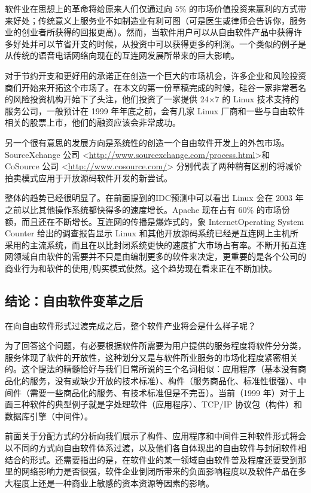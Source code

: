 软件业在思想上的革命将给原来人们仅通过向 5\% 的市场价值投资来赢利的方式带来好处；传统意义上服务业不如制造业有利可图（可是医生或律师会告诉你，服务业的创业者所获得的回报更高）。然而，当软件用户可以从自由软件产品中获得许多好处并可以节省开支的时候，从投资中可以获得更多的利润。一个类似的例子是从传统的语音电话网络向现在的互连网发展所带来的巨大影响。


对于节约开支和更好用的承诺正在创造一个巨大的市场机会，许多企业和风险投资商们开始来开拓这个市场了。在本文的第一份草稿完成的时候，硅谷一家非常著名的风险投资机构开始下了头注，他们投资了一家提供 24$\times$7 的 Linux 技术支持的服务公司，一般预计在 1999 年年底之前，会有几家 Linux 厂商和一些与自由软件相关的股票上市，他们的融资应该会非常成功。


另一个很有意思的发展方向是系统性的创造一个自由软件开发上的外包市场。SourceXchange 公司 <\url{http://www.sourcexchange.com/process.html}>和 CoSource 公司 <\url{http://www.cosource.com/}> 分别代表了两种稍有区别的将减价拍卖模式应用于开放源码软件开发的新尝试。


整体的趋势已经很明显了。在前面提到的IDC预测中可以看出 Linux 会在 2003 年之前以比其他操作系统都快得多的速度增长。Apache 现在占有 60\% 的市场份额，而且还在不断增长。互连网的传播是爆炸式的，象 InternetOperating System Counter 给出的调查报告显示 Linux 和其他开放源码系统已经是互连网上主机所采用的主流系统，而且在以比封闭系统更快的速度扩大市场占有率。不断开拓互连网领域自由软件的需要并不只是由编制更多的软件来决定，更重要的是各个公司的商业行为和软件的使用/购买模式使然。这个趋势现在看来正在不断加快。

\subsection{结论：自由软件变革之后}
在向自由软件形式过渡完成之后，整个软件产业将会是什么样子呢？


为了回答这个问题，有必要根据软件所需要为用户提供的服务程度将软件分分类，服务体现了软件的开放性，这种划分又是与软件所业服务的市场化程度紧密相关的。这个提法的精髓恰好与我们日常所说的三个名词相似：应用程序（基本没有商品化的服务，没有或缺少开放的技术标准）、构件（服务商品化、标准性很强）、中间件（需要一些商品化的服务、有技术标准但是不完善）。当前（1999 年）对于上面三种软件的典型例子就是字处理软件（应用程序）、TCP/IP 协议包（构件）和数据库引擎（中间件）。


前面关于分配方式的分析向我们展示了构件、应用程序和中间件三种软件形式将会以不同的方式向自由软件体系过渡，以及他们各自体现出的自由软件与封闭软件相结合的形式。还需要指出的是，在软件业的某一领域自由软件普及程度还要受到那里的网络影响力是否很强，软件企业倒闭所带来的负面影响程度以及软件产品在多大程度上还是一种商业上敏感的资本资源等因素的影响。


